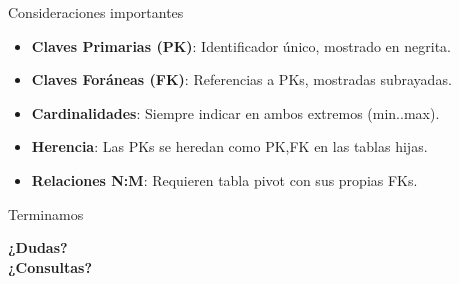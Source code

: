 \documentclass{beamer}
\begin{document}
\begin{frame}{Consideraciones importantes}
    \begin{itemize}
        \item<1-> \textbf{Claves Primarias (PK)}: Identificador único, mostrado en negrita.
        \item<2-> \textbf{Claves Foráneas (FK)}: Referencias a PKs, mostradas subrayadas.
        \item<3-> \textbf{Cardinalidades}: Siempre indicar en ambos extremos (min..max).
        \item<4-> \textbf{Herencia}: Las PKs se heredan como PK,FK en las tablas hijas.
        \item<5-> \textbf{Relaciones N:M}: Requieren tabla pivot con sus propias FKs.
    \end{itemize}
\end{frame}

\begin{frame}{Terminamos}
    \begin{center}
        \Large{\textbf{¿Dudas?\\¿Consultas?}}
    \end{center}
\end{frame}
\end{document}
